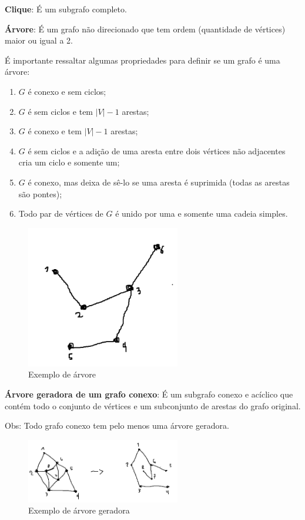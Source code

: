 \medskip

\textbf{Clique}:
É um subgrafo completo.

\medskip

\textbf{Árvore}:
É um grafo não direcionado que tem ordem (quantidade de vértices) maior ou igual a 2.

É importante ressaltar algumas propriedades para definir se um grafo é uma árvore:
\begin{enumerate}
    \item $G$ é conexo e sem ciclos;
    \item $G$ é sem ciclos e tem $|V|-1$ arestas;
    \item $G$ é conexo e tem $|V|-1$ arestas;
    \item $G$ é sem ciclos e a adição de uma aresta entre dois vértices não adjacentes cria um ciclo e somente um;
    \item $G$ é conexo, mas deixa de sê-lo se uma aresta é suprimida (todas as arestas são pontes);
    \item Todo par de vértices de $G$ é unido por uma e somente uma cadeia simples.
\end{enumerate}

\begin{figure}[H]
    \centering
    \includegraphics[width=0.6\textwidth]{figuras/Arvore.png}
    \caption{Exemplo de árvore}
\end{figure}

\medskip

\textbf{Árvore geradora de um grafo conexo}:
É um subgrafo conexo e acíclico que contém todo o conjunto de vértices e um subconjunto de arestas do grafo original.

Obs: Todo grafo conexo tem pelo menos uma árvore geradora.

\begin{figure}[H]
    \centering
    \includegraphics[width=0.6\textwidth]{figuras/Arvoregeradora.png}
    \caption{Exemplo de árvore geradora}
\end{figure}

